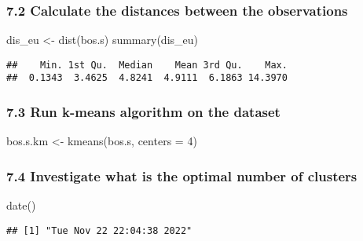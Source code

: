 \documentclass[
]{article}
\newenvironment{Shaded}{\begin{snugshade}}{\end{snugshade}}
\newcommand{\AttributeTok}[1]{\textcolor[rgb]{0.77,0.63,0.00}{#1}}
\newcommand{\DecValTok}[1]{\textcolor[rgb]{0.00,0.00,0.81}{#1}}
\newcommand{\FunctionTok}[1]{\textcolor[rgb]{0.00,0.00,0.00}{#1}}
\newcommand{\NormalTok}[1]{#1}
\newcommand{\OtherTok}[1]{\textcolor[rgb]{0.56,0.35,0.01}{#1}}
\begin{document}
\hypertarget{calculate-the-distances-between-the-observations}{%
\subsubsection{7.2 Calculate the distances between the
observations}\label{calculate-the-distances-between-the-observations}}

\begin{Shaded}
\begin{Highlighting}[]
\NormalTok{dis\_eu }\OtherTok{\textless{}{-}} \FunctionTok{dist}\NormalTok{(bos.s)}
\FunctionTok{summary}\NormalTok{(dis\_eu)}
\end{Highlighting}
\end{Shaded}

\begin{verbatim}
##    Min. 1st Qu.  Median    Mean 3rd Qu.    Max. 
##  0.1343  3.4625  4.8241  4.9111  6.1863 14.3970
\end{verbatim}

\hypertarget{run-k-means-algorithm-on-the-dataset}{%
\subsubsection{7.3 Run k-means algorithm on the
dataset}\label{run-k-means-algorithm-on-the-dataset}}

\begin{Shaded}
\begin{Highlighting}[]
\NormalTok{bos.s.km }\OtherTok{\textless{}{-}} \FunctionTok{kmeans}\NormalTok{(bos.s, }\AttributeTok{centers =} \DecValTok{4}\NormalTok{) }
\end{Highlighting}
\end{Shaded}

\hypertarget{investigate-what-is-the-optimal-number-of-clusters}{%
\subsubsection{7.4 Investigate what is the optimal number of
clusters}\label{investigate-what-is-the-optimal-number-of-clusters}}

\begin{Shaded}
\begin{Highlighting}[]
\FunctionTok{date}\NormalTok{()}
\end{Highlighting}
\end{Shaded}

\begin{verbatim}
## [1] "Tue Nov 22 22:04:38 2022"
\end{verbatim}
\end{document}
